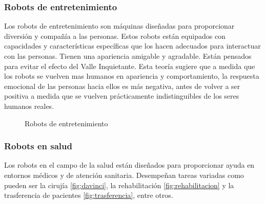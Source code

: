 \subsubsection{Robots de entretenimiento}
Los robots de entretenimiento son máquinas diseñadas para proporcionar diversión y compañía a las personas. Estos robots están equipados con capacidades y 
características específicas que los hacen adecuados para interactuar con las personas. Tienen una apariencia amigable y agradable. Están pensados para 
evitar el efecto del Valle Inquietante. Esta teoría sugiere que a medida que los robots se vuelven mas humanos en apariencia y comportamiento, la respuesta 
emocional de las personas hacia ellos es más negativa, antes de volver a ser positiva a medida que se vuelven prácticamente 
indistinguibles de los seres humanos reales.
\begin{figure} [ht!]
  \centering    
  \hspace{1cm}
  \caption{Robots de entretenimiento}
\end{figure}

\subsubsection{Robots en salud}
Los robots en el campo de la salud están diseñados para proporcionar ayuda en entornos médicos y de atención sanitaria. Desempeñan tareas 
variadas como pueden ser la cirujía \ref{fig:davinci}, la rehabilitación \ref{fig:rehabilitacion} y la trasferencia de pacientes \ref{fig:trasferencia}, entre otros.

